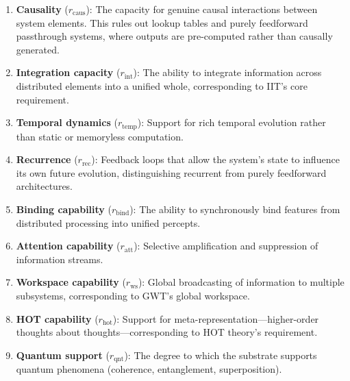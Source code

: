 \documentclass[12pt,a4paper]{article}
\begin{document}
\begin{enumerate}
    \item \textbf{Causality} ($r_{\text{caus}}$): The capacity for genuine causal interactions between system elements. This rules out lookup tables and purely feedforward passthrough systems, where outputs are pre-computed rather than causally generated.
    \item \textbf{Integration capacity} ($r_{\text{int}}$): The ability to integrate information across distributed elements into a unified whole, corresponding to IIT's core requirement.
    \item \textbf{Temporal dynamics} ($r_{\text{temp}}$): Support for rich temporal evolution rather than static or memoryless computation.
    \item \textbf{Recurrence} ($r_{\text{rec}}$): Feedback loops that allow the system's state to influence its own future evolution, distinguishing recurrent from purely feedforward architectures.
    \item \textbf{Binding capability} ($r_{\text{bind}}$): The ability to synchronously bind features from distributed processing into unified percepts.
    \item \textbf{Attention capability} ($r_{\text{att}}$): Selective amplification and suppression of information streams.
    \item \textbf{Workspace capability} ($r_{\text{ws}}$): Global broadcasting of information to multiple subsystems, corresponding to GWT's global workspace.
    \item \textbf{HOT capability} ($r_{\text{hot}}$): Support for meta-representation---higher-order thoughts about thoughts---corresponding to HOT theory's requirement.
    \item \textbf{Quantum support} ($r_{\text{qnt}}$): The degree to which the substrate supports quantum phenomena (coherence, entanglement, superposition).
\end{enumerate}
\end{document}
